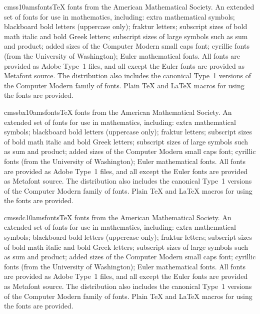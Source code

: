 \documentclass{ddltxtyp}
\begin{document}
\begin{package}{cmss10}{amsfonts}{{\TeX} fonts from the American Mathematical Society.}
An extended set of fonts for use in mathematics, including:
extra mathematical symbols; blackboard bold letters (uppercase
only); fraktur letters; subscript sizes of bold math italic and
bold Greek letters; subscript sizes of large symbols such as
sum and product; added sizes of the Computer Modern small caps
font; cyrillic fonts (from the University of Washington); Euler
mathematical fonts. All fonts are provided as Adobe Type~1
files, and all except the Euler fonts are provided as Metafont
source. The distribution also includes the canonical Type~1
versions of the Computer Modern family of fonts. Plain {\TeX} and
{\LaTeX} macros for using the fonts are provided.
\end{package}
\begin{package}{cmssbx10}{amsfonts}{{\TeX} fonts from the American Mathematical Society.}
An extended set of fonts for use in mathematics, including:
extra mathematical symbols; blackboard bold letters (uppercase
only); fraktur letters; subscript sizes of bold math italic and
bold Greek letters; subscript sizes of large symbols such as
sum and product; added sizes of the Computer Modern small caps
font; cyrillic fonts (from the University of Washington); Euler
mathematical fonts. All fonts are provided as Adobe Type~1
files, and all except the Euler fonts are provided as Metafont
source. The distribution also includes the canonical Type~1
versions of the Computer Modern family of fonts. Plain {\TeX} and
{\LaTeX} macros for using the fonts are provided.
\end{package}
\begin{package}{cmssdc10}{amsfonts}{{\TeX} fonts from the American Mathematical Society.}
An extended set of fonts for use in mathematics, including:
extra mathematical symbols; blackboard bold letters (uppercase
only); fraktur letters; subscript sizes of bold math italic and
bold Greek letters; subscript sizes of large symbols such as
sum and product; added sizes of the Computer Modern small caps
font; cyrillic fonts (from the University of Washington); Euler
mathematical fonts. All fonts are provided as Adobe Type~1
files, and all except the Euler fonts are provided as Metafont
source. The distribution also includes the canonical Type~1
versions of the Computer Modern family of fonts. Plain {\TeX} and
{\LaTeX} macros for using the fonts are provided.
\end{package}
\end{document}
